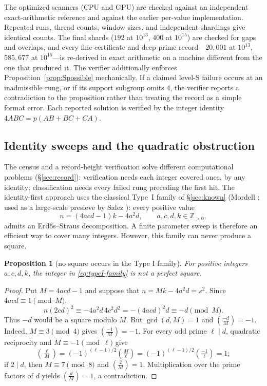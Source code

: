 \documentclass[11pt]{article}
\newtheorem{proposition}[theorem]{Proposition}
\theoremstyle{definition}
\theoremstyle{remark}
\newcommand{\jac}[2]{\left(\tfrac{#1}{#2}\right)}
\begin{document}
The optimized scanners (CPU and GPU) are checked against an independent
exact-arithmetic reference and against the earlier per-value implementation. Repeated
runs, thread counts, window sizes, and independent shardings give identical counts.
The final shards ($192$ at $10^{13}$, $400$ at $10^{15}$) are checked for gaps and
overlaps, and every fine-certificate and deep-prime record---$20{,}001$ at $10^{13}$,
$585{,}677$ at $10^{15}$---is re-derived in exact arithmetic on a machine different
from the one that produced it. The verifier additionally enforces
Proposition~\ref{prop:Spossible} mechanically. If a claimed level-S failure occurs at
an inadmissible rung, or if its support subgroup omits $4$, the verifier reports a
contradiction to the proposition rather than treating the record as a simple format
error. Each reported solution is verified by the integer identity
$4ABC=p(AB+BC+CA)$.

\subsection{Identity sweeps and the quadratic obstruction}\label{sec:sweep}

The census and a record-height verification solve different computational problems
(\S\ref{sec:record}): verification needs each integer covered once, by any identity;
classification needs every failed rung preceding the first hit. The identity-first
approach uses the classical Type~I family of \S\ref{sec:known} (Mordell
\cite{Mordell1969}; used as a large-scale presieve by Salez \cite{Salez2014}): every
positive value
\begin{equation}\label{eq:typeI-family}
n=(4acd-1)k-4a^2d,\qquad a,c,d,k\in\mathbb Z_{>0},
\end{equation}
admits an Erd\H{o}s--Straus decomposition. A finite parameter sweep is therefore an
efficient way to cover many integers. However, this family can never produce a square.

\begin{proposition}[no square occurs in the Type I family]\label{prop:nosquare}
For positive integers $a,c,d,k$, the integer in \eqref{eq:typeI-family} is not a
perfect square.
\end{proposition}

\begin{proof}
Put $M=4acd-1$ and suppose that $n=Mk-4a^2d=s^2$. Since
$4acd\equiv1\pmod M$,
\[
n(2cd)^2\equiv-4a^2d\,4c^2d^2=-(4acd)^2d\equiv-d\pmod M.
\]
Thus $-d$ would be a square modulo $M$. But $\gcd(d,M)=1$ and
$\jac{-d}{M}=-1$. Indeed, $M\equiv3\pmod4$ gives $\jac{-1}{M}=-1$.
For every odd prime $\ell\mid d$, quadratic reciprocity and
$M\equiv-1\pmod\ell$ give
\[
\jac{\ell}{M}=(-1)^{(\ell-1)/2}\jac{M}{\ell}
=(-1)^{(\ell-1)/2}\jac{-1}{\ell}=1;
\]
if $2\mid d$, then $M\equiv7\pmod8$ and $\jac{2}{M}=1$. Multiplication over
the prime factors of $d$ yields $\jac{d}{M}=1$, a contradiction.
\end{proof}
\end{document}
